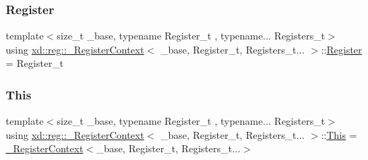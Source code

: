 \subsubsection{\texorpdfstring{Register}{Register}}
{\footnotesize\ttfamily template$<$size\+\_\+t \+\_\+base, typename Register\+\_\+t , typename... Registers\+\_\+t$>$ \\
using \mbox{\hyperlink{classxd_1_1reg_1_1___register_context}{xd\+::reg\+::\+\_\+\+Register\+Context}}$<$ \+\_\+base, Register\+\_\+t, Registers\+\_\+t... $>$\+::\mbox{\hyperlink{classxd_1_1reg_1_1___register_context_3_01__base_00_01_register__t_00_01_registers__t_8_8_8_01_4_ac0bf9580e40d5a0ed29d3ea9fc36ac89}{Register}} =  Register\+\_\+t}

\mbox{\label{classxd_1_1reg_1_1___register_context_3_01__base_00_01_register__t_00_01_registers__t_8_8_8_01_4_ac72bc7f4deacb1a6aa0f286c1b4c01e2}} 
\subsubsection{\texorpdfstring{This}{This}}
{\footnotesize\ttfamily template$<$size\+\_\+t \+\_\+base, typename Register\+\_\+t , typename... Registers\+\_\+t$>$ \\
using \mbox{\hyperlink{classxd_1_1reg_1_1___register_context}{xd\+::reg\+::\+\_\+\+Register\+Context}}$<$ \+\_\+base, Register\+\_\+t, Registers\+\_\+t... $>$\+::\mbox{\hyperlink{classxd_1_1reg_1_1___register_context_3_01__base_00_01_register__t_00_01_registers__t_8_8_8_01_4_ac72bc7f4deacb1a6aa0f286c1b4c01e2}{This}} =  \mbox{\hyperlink{classxd_1_1reg_1_1___register_context}{\+\_\+\+Register\+Context}}$<$\+\_\+base, Register\+\_\+t, Registers\+\_\+t...$>$\hspace{0.3cm}{\ttfamily [protected]}}



